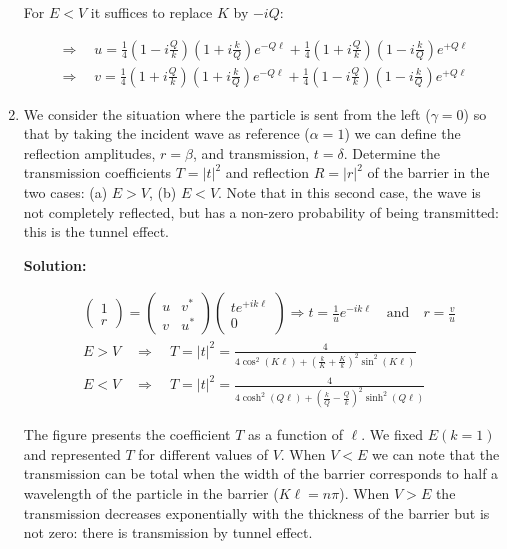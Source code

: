 \documentclass{article}
\begin{document}
\begin{enumerate}
{    For $E<V$ it suffices to replace $K$ by $-i Q$:

    $$
    \begin{aligned}
    \Rightarrow \quad u = \frac{1}{4} \left(1-i \frac{Q}{k}\right) \left(1+i \frac{k}{Q}\right) e^{-Q \ell} + \frac{1}{4} \left(1+i \frac{Q}{k}\right) \left(1-i \frac{k}{Q}\right) e^{+Q \ell} \\
    \Rightarrow \quad v = \frac{1}{4} \left(1+i \frac{Q}{k}\right) \left(1+i \frac{k}{Q}\right) e^{-Q \ell} + \frac{1}{4} \left(1-i \frac{Q}{k}\right) \left(1-i \frac{k}{Q}\right) e^{+Q \ell}
    \end{aligned}
    $$}

    \item We consider the situation where the particle is sent from the left ($\gamma=0$) so that by taking the incident wave as reference ($\alpha=1$) we can define the reflection amplitudes, $r=\beta$, and transmission, $t=\delta$. Determine the transmission coefficients $T=|t|^{2}$ and reflection $R=|r|^{2}$ of the barrier in the two cases: (a) $E>V$, (b) $E<V$. Note that in this second case, the wave is not completely reflected, but has a non-zero probability of being transmitted: this is the tunnel effect.

    {\color{red}\textbf{Solution:}

    $$
    \begin{aligned}
    & \left(\begin{array}{c}
    1 \\
    r
    \end{array}\right) = \left(\begin{array}{cc}
    u & v^{*} \\
    v & u^{*}
    \end{array}\right) \left(\begin{array}{c}
    t e^{+i k \ell} \\
    0
    \end{array}\right) \Rightarrow t = \frac{1}{u} e^{-i k \ell} \quad \text{and} \quad r = \frac{v}{u} \\
    & E>V \quad \Rightarrow \quad T = |t|^{2} = \frac{4}{4 \cos ^{2}(K \ell) + \left(\frac{k}{K} + \frac{K}{k}\right)^{2} \sin ^{2}(K \ell)} \\
    & E<V \quad \Rightarrow \quad T = |t|^{2} = \frac{4}{4 \cosh ^{2}(Q \ell) + \left(\frac{k}{Q} - \frac{Q}{k}\right)^{2} \sinh ^{2}(Q \ell)}
    \end{aligned}
    $$

    The figure presents the coefficient $T$ as a function of $\ell$. We fixed $E(k=1)$ and represented $T$ for different values of $V$. When $V<E$ we can note that the transmission can be total when the width of the barrier corresponds to half a wavelength of the particle in the barrier ($K \ell = n \pi$). When $V>E$ the transmission decreases exponentially with the thickness of the barrier but is not zero: there is transmission by tunnel effect.}


\end{enumerate}
\end{document}
